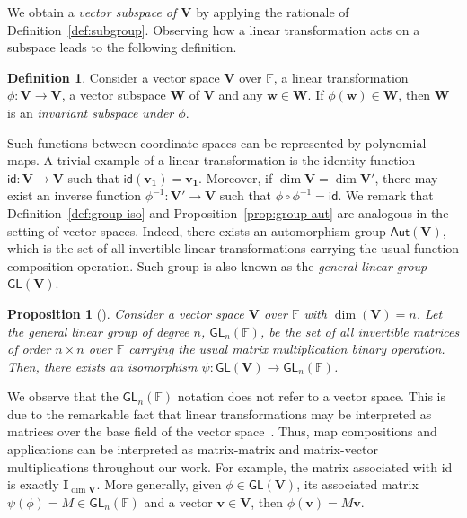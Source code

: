 \documentclass[12pt, a4paper, oneside]{memoir}
\newtheorem{proposition}[theorem]{Proposition}
\theoremstyle{definition}
\newtheorem{definition}[theorem]{Definition}
\begin{document}
We obtain a \emph{vector subspace of $\mathbf{V}$} by applying the rationale of Definition~\ref{def:subgroup}. Observing how a linear transformation acts on a subspace leads to the following definition.

\begin{definition}
  Consider a vector space $\mathbf{V}$ over $\mathbb{F}$, a linear transformation $\phi : \mathbf{V} \to \mathbf{V}$, a vector subspace $\mathbf{W}$ of $\mathbf{V}$ and any $\mathbf{w} \in \mathbf{W}$. If $\phi(\mathbf{w}) \in \mathbf{W}$, then $\mathbf{W}$ is an \emph{invariant subspace under $\phi$}.
\end{definition}

Such functions between coordinate spaces can be represented by polynomial maps. A trivial example of a linear transformation is the identity function $\mathsf{id} : \mathbf{V} \to \mathbf{V}$ such that $\mathsf{id}(\mathbf{v_{1}}) = \mathbf{v_{1}}$. Moreover, if $\dim \mathbf{V} = \dim \mathbf{V'}$, there may exist an inverse function $\phi^{-1} : \mathbf{V'} \to \mathbf{V}$ such that $\phi \circ \phi^{-1} = \mathsf{id}$. We remark that Definition~\ref{def:group-iso} and Proposition~\ref{prop:group-aut} are analogous in the setting of vector spaces. Indeed, there exists an automorphism group $\mathsf{Aut}(\mathbf{V})$, which is the set of all invertible linear transformations carrying the usual function composition operation. Such group is also known as the \emph{general linear group} $\mathsf{GL}(\mathbf{V})$.

\begin{proposition}[{\cite[p.~418, Cor.~14]{Dummit:2003}}]
  Consider a vector space $\mathbf{V}$ over $\mathbb{F}$ with $\dim(\mathbf{V}) = n$. Let the \emph{general linear group of degree $n$, $\mathsf{GL}_{n}(\mathbb{F})$}, be the set of all invertible matrices of order $n \times n$ over $\mathbb{F}$ carrying the usual matrix multiplication binary operation. Then, there exists an isomorphism $\psi : \mathsf{GL}(\mathbf{V}) \to \mathsf{GL}_{n}(\mathbb{F})$.
\end{proposition}

We observe that the $\mathsf{GL}_{n}(\mathbb{F})$ notation does not refer to a vector space. This is due to the remarkable fact that linear transformations may be interpreted as matrices over the base field of the vector space~\cite[Sec.~11.2]{Dummit:2003}. Thus, map compositions and applications can be interpreted as matrix-matrix and matrix-vector multiplications throughout our work. For example, the matrix associated with \textsf{id} is exactly $\mathbf{I}_{\dim \mathbf{V}}$. More generally, given $\phi \in \mathsf{GL}(\mathbf{V})$, its associated matrix $\psi(\phi) = M \in \mathsf{GL}_{n}(\mathbb{F})$ and a vector $\mathbf{v} \in \mathbf{V}$, then $\phi(\mathbf{v}) = M\mathbf{v}$.
\end{document}
